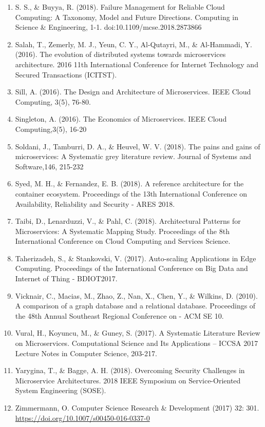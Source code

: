 \documentclass{article}
\begin{document}
\begin{enumerate}
\item S. S., \& Buyya, R. (2018). Failure Management for Reliable Cloud Computing: A Taxonomy, Model and Future Directions. Computing in Science \& Engineering, 1-1. doi:10.1109/mcse.2018.2873866


\item Salah, T., Zemerly, M. J., Yeun, C. Y., Al-Qutayri, M., \& Al-Hammadi, Y. (2016). The evolution of distributed systems towards microservices architecture. 2016 11th International Conference for Internet Technology and Secured Transactions (ICITST). 

\item Sill, A. (2016). The Design and Architecture of Microservices. IEEE Cloud Computing, 3(5), 76-80. 


\item Singleton, A. (2016). The Economics of Microservices. IEEE Cloud Computing,3(5), 16-20


\item Soldani, J., Tamburri, D. A., \& Heuvel, W. V. (2018). The pains and gains of microservices: A Systematic grey literature review. Journal of Systems and Software,146, 215-232


\item Syed, M. H., \& Fernandez, E. B. (2018). A reference architecture for the container ecosystem. Proceedings of the 13th International Conference on Availability, Reliability and Security - ARES 2018. 


\item Taibi, D., Lenarduzzi, V., \& Pahl, C. (2018). Architectural Patterns for Microservices: A Systematic Mapping Study. Proceedings of the 8th International Conference on Cloud Computing and Services Science. 


\item Taherizadeh, S., \& Stankovski, V. (2017). Auto-scaling Applications in Edge Computing. Proceedings of the International Conference on Big Data and Internet of Thing - BDIOT2017. 


\item Vicknair, C., Macias, M., Zhao, Z., Nan, X., Chen, Y., \& Wilkins, D. (2010). A comparison of a graph database and a relational database. Proceedings of the 48th Annual Southeast Regional Conference on - ACM SE 10. 


\item Vural, H., Koyuncu, M., \& Guney, S. (2017). A Systematic Literature Review on Microservices. Computational Science and Its Applications – ICCSA 2017 Lecture Notes in Computer Science, 203-217. 


\item Yarygina, T., \& Bagge, A. H. (2018). Overcoming Security Challenges in Microservice Architectures. 2018 IEEE Symposium on Service-Oriented System Engineering (SOSE). 


\item Zimmermann, O. Computer Science Research \& Development (2017) 32: 301. \url{https://doi.org/10.1007/s00450-016-0337-0} 

\end{enumerate}
\end{document}
